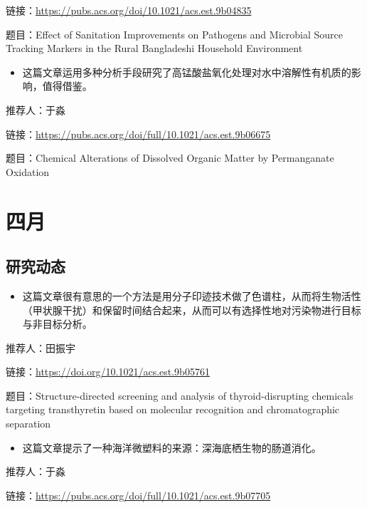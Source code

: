 \documentclass[]{book}
\providecommand{\tightlist}{%
  \setlength{\itemsep}{0pt}\setlength{\parskip}{0pt}}
\begin{document}
链接：\url{https://pubs.acs.org/doi/10.1021/acs.est.9b04835}

题目：Effect of Sanitation Improvements on Pathogens and Microbial Source Tracking Markers in the Rural Bangladeshi Household Environment

\begin{itemize}
\tightlist
\item
  这篇文章运用多种分析手段研究了高锰酸盐氧化处理对水中溶解性有机质的影响，值得借鉴。
\end{itemize}

推荐人：于淼

链接：\url{https://pubs.acs.org/doi/full/10.1021/acs.est.9b06675}

题目：Chemical Alterations of Dissolved Organic Matter by Permanganate Oxidation

\hypertarget{ux56dbux6708-2}{%
\section*{四月}\label{ux56dbux6708-2}}

\hypertarget{ux7814ux7a76ux52a8ux6001-29}{%
\subsection*{研究动态}\label{ux7814ux7a76ux52a8ux6001-29}}

\begin{itemize}
\tightlist
\item
  这篇文章很有意思的一个方法是用分子印迹技术做了色谱柱，从而将生物活性（甲状腺干扰）和保留时间结合起来，从而可以有选择性地对污染物进行目标与非目标分析。
\end{itemize}

推荐人：田振宇

链接：\url{https://doi.org/10.1021/acs.est.9b05761}

题目：Structure-directed screening and analysis of thyroid-disrupting chemicals targeting transthyretin based on molecular recognition and chromatographic separation

\begin{itemize}
\tightlist
\item
  这篇文章提示了一种海洋微塑料的来源：深海底栖生物的肠道消化。
\end{itemize}

推荐人：于淼

链接：\url{https://pubs.acs.org/doi/full/10.1021/acs.est.9b07705}
\end{document}
